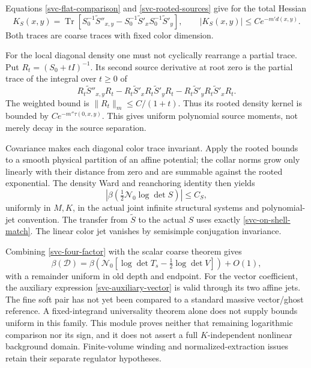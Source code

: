 \documentclass[11pt]{article}
\theoremstyle{remark}
\begin{document}
Equations \eqref{svc-flat-comparison} and
\eqref{svc-rooted-sources} give for the total Hessian
\begin{equation}
 K_S(x,y)=\operatorname{Tr}\left[
 S_0^{-1}\widetilde S''_{x,y}
 -S_0^{-1}\widetilde S'_xS_0^{-1}\widetilde S'_y\right],
 \qquad |K_S(x,y)|\le Ce^{-m' d(x,y)}.
 \label{svc-log-hessian}
\end{equation}
Both traces are coarse traces with fixed color dimension.

For the local diagonal density one must not cyclically rearrange a
partial trace. Put $R_t=(S_0+tI)^{-1}$. Its second source derivative
at root zero is the partial trace of the integral over $t\ge0$ of
\begin{equation}
 R_t\widetilde S''_{x,y}R_t
 -R_t\widetilde S'_xR_t\widetilde S'_yR_t
 -R_t\widetilde S'_yR_t\widetilde S'_xR_t.
 \label{svc-density-resolvent}
\end{equation}
The weighted bound is $\|R_t\|_m\le C/(1+t)$.
Thus its rooted density kernel is bounded by
$Ce^{-m''\tau(0,x,y)}$. This gives uniform polynomial source moments,
not merely decay in the source separation.

Covariance makes each diagonal color trace invariant. Apply the
rooted bounds to a smooth physical partition of an affine potential;
the collar norms grow only linearly with their distance from zero and
are summable against the rooted exponential. The density Ward and
reanchoring identity then yields
\begin{equation}
 \left|\beta\left(\tfrac12\mathcal N_0\log\det S\right)\right|
       \le C_S,
 \label{svc-bounded-remainder}
\end{equation}
uniformly in $M,K$, in the actual joint infinite structural systems
and polynomial-jet convention. The transfer from $\widetilde S$ to the
actual $S$ uses exactly \eqref{svc-on-shell-match}. The linear color jet
vanishes by semisimple conjugation invariance.

Combining \eqref{svc-four-factor} with the scalar coarse theorem gives
\begin{equation}
 \beta(\mathcal D)
  =\beta\!\left(\mathcal N_0
       [\log\det T_s-\tfrac12\log\det V]\right)+O(1),
 \label{svc-final-reduction}
\end{equation}
with a remainder uniform in old depth and endpoint. For the vector
coefficient, the auxiliary expression
\eqref{svc-auxiliary-vector} is valid through its two affine jets.
The fine soft pair has not yet been compared to a standard massive
vector/ghost reference. A fixed-integrand universality theorem alone
does not supply bounds uniform in this family. This module proves
neither that remaining logarithmic comparison nor its sign, and it
does not assert a full $K$-independent nonlinear background domain.
Finite-volume winding and normalized-extraction issues retain their
separate regulator hypotheses.
\end{document}
